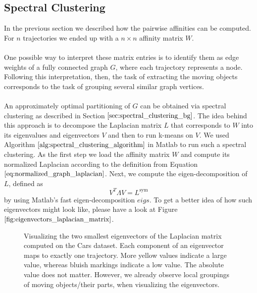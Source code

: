 \subsection{Spectral Clustering}
\label{sec:spectral_clustering_impl}
In the previous section we described how the pairwise affinities can be computed. For $n$ trajectories we ended up with a $n \times n$ affinity matrix $W$. \\ \\ 
One possible way to interpret these matrix entries is to identify them as edge weights of a fully connected graph $G$, where each trajectory represents a node. Following this interpretation, then, the task of extracting the moving objects  corresponds to the task of grouping several similar graph vertices. \\ \\
An approximately optimal partitioning of $G$ can be obtained via spectral clustering as described in Section $\ref{sec:spectral_clustering_bg}$. The idea behind this approach is to decompose the Laplacian matrix $L$ that corresponds to $W$ into its eigenvalues and eigenvectors $V$ and then to run k-means on $V$. We used Algorithm $\ref{alg:spectral_clustering_algorithm}$ in Matlab to run such a spectral clustering. As the first step we load the affinity matrix $W$ and compute its normalized Laplacian according to the definition from Equation $\ref{eq:normalized_graph_laplacian}$. Next, we compute the eigen-decomposition of $L$, defined as
\begin{equation}
	V^{T} \Lambda V = L^{\text{sym}}
\end{equation}
by using Matlab's fast eigen-decomposition $\textit{eigs}$. To get a better idea of how such eigenvectors might look like, please have a look at Figure $\ref{fig:eigenvectors_laplacian_matrix}$.
\begin{figure}[H]
\begin{center}
\end{center}
\caption[Eigenvectors of Laplacian Matrix]{Visualizing the two smallest eigenvectors of the Laplacian matrix computed on the Cars dataset. Each component of an eigenvector maps to exactly one trajectory. More yellow values indicate a large value, whereas bluish markings indicate a low value. The absolute value does not matter. However, we already observe local groupings of moving objects/their parts, when visualizing the eigenvectors.}
\label{fig:eigenvectors_laplacian_matrix}
\end{figure}
